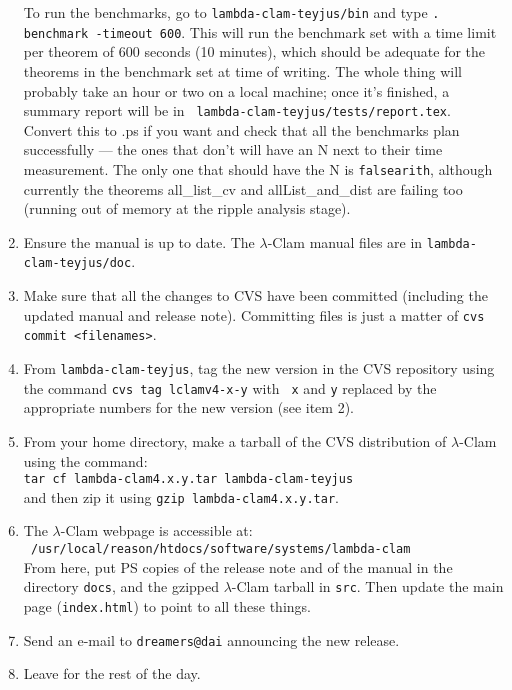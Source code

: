 \documentclass[11pt]{article}
\begin{document}
\begin{enumerate}
  To run the benchmarks, go to {\tt lambda-clam-teyjus/bin} and type
  {\tt . benchmark -timeout 600}. This will run the benchmark set with
  a time limit per theorem of 600 seconds (10 minutes), which should
  be adequate for the theorems in the benchmark set at time of
  writing.  The whole thing will probably take an hour or two on a
  local machine; once it's finished, a summary report will be in {\tt
    lambda-clam-teyjus/tests/report.tex}.  Convert this to .ps if you
  want and check that all the benchmarks plan successfully --- the
  ones that don't will have an N next to their time measurement.  The
  only one that should have the N is {\tt falsearith}, although
  currently the theorems all\_list\_cv and allList\_and\_dist are
  failing too (running out of memory at the ripple analysis stage).
\item Ensure the manual is up to date.  The $\lambda$-Clam manual
  files are in {\tt lambda-clam-teyjus/doc}.
\item Make sure that all the changes to CVS have been committed
  (including the updated manual and release note). Committing files is
  just a matter of {\tt cvs commit <filenames>}.
\item From {\tt lambda-clam-teyjus}, tag the new version in the CVS
  repository using the command {\tt cvs tag lclamv4-x-y} with {\tt
    x} and {\tt y} replaced by the appropriate numbers for the new
  version (see item 2).
\item From your home directory, make a tarball of the CVS distribution
  of $\lambda$-Clam using the command: \\ {\tt tar cf
    lambda-clam4.x.y.tar lambda-clam-teyjus} \\ \noindent and then zip
  it using {\tt gzip lambda-clam4.x.y.tar}.
\item The $\lambda$-Clam webpage is accessible at: \\ {\tt
    /usr/local/reason/htdocs/software/systems/lambda-clam} \\  From here,
  put PS copies of the release note and of the manual in the directory
  {\tt docs}, and the gzipped $\lambda$-Clam tarball in {\tt src}.
  Then update the main page ({\tt index.html}) to point to all these things.
\item Send an e-mail to {\tt dreamers@dai} announcing the new release.
\item Leave for the rest of the day.

\end{enumerate}
\end{document}
